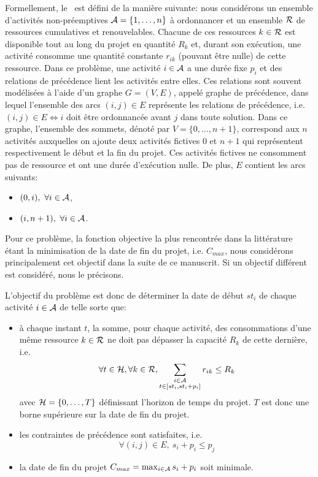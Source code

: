 Formellement, le \RCPSP~est défini de la manière suivante: nous
considérons un ensemble d'activités non-préemptives ${\cal A}=\{1,\dots,n\}$
à ordonnancer et un ensemble ${\cal R}$ de ressources cumulatives et
renouvelables. Chacune de ces ressources $k \in {\cal R}$ est disponible
tout au long du projet en quantité $R_k$ et, durant son exécution, une
activité consomme une quantité constante $r_{ik}$ (pouvant être nulle)
de cette ressource. Dans ce problème, une activité $i \in {\cal A}$ a une
durée fixe $p_i$ et des relations de précédence lient les activités
entre elles. Ces relations sont souvent modélisées à l'aide d'un
graphe $G=(V,E)$, appelé graphe de précédence, dans lequel l'ensemble
des arcs $(i,j) \in E$ représente les relations de précédence,
i.e. $(i,j) \in E \Leftrightarrow i $ doit être ordonnancée avant $j$
dans toute solution. Dans ce graphe, l'ensemble des sommets, dénoté
par $V=\{0,\dots,n+1\}$, correspond aux $n$ activités auxquelles on
ajoute deux activités fictives $0$ et $n+1$ qui représentent
respectivement le début et la fin du projet. Ces activités fictives ne
consomment pas de ressource et ont une durée d'exécution nulle. De
plus, $E$ contient les arcs suivants:
\begin{itemize}
\item $(0,i),\ \forall i \in {\cal A}$,
\item $(i,n+1),\ \forall i \in {\cal A}$.
\end{itemize}

Pour ce problème, la fonction objective la
plus rencontrée dans la littérature étant la minimisation de la date
de fin du projet, i.e. $C_{max}$, nous considérons principalement cet
objectif dans la suite de ce manuscrit. Si un objectif différent est
considéré, nous le précisons. 

L'objectif du problème est donc de déterminer la date de début $st_i$
de chaque activité $i\in {\cal A}$ de telle sorte que:
\begin{itemize}
\item à chaque instant $t$, la somme, pour chaque activité, des
  consommations d'une même ressource $k \in {\cal R}$ ne doit pas dépasser la
  capacité $R_{k}$ de cette dernière, i.e.
  \begin{equation}\forall t \in {\cal H}, \forall k \in {\cal R},\sum_{\substack{i\in {\cal A}\\ t \in
        [st_i,st_i+p_i]}} r_{ik} \le R_k\end{equation} 
  avec ${\cal H}=\{0,\dots,T\}$ définissant l'horizon de temps du projet. $T$
  est donc une borne supérieure sur la date de fin du projet.
\item les contraintes de précédence sont satisfaites, i.e. 
  \begin{equation} \forall (i,j) \in E,\ s_i+p_i \le p_j \end{equation}
\item la date de fin du projet $C_{max}= \max_{i \in {\cal A}} s_i+p_i$
  soit minimale. 
\end{itemize}

